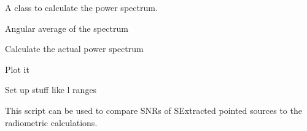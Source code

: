 \documentclass[a4paper,11pt,english]{sphinxmanual}
\begin{document}
\begin{fulllineitems}
\label{analysis:analysis.CTIpower.ps}
A class to calculate the power spectrum.

\begin{fulllineitems}
\label{analysis:analysis.CTIpower.ps.angavg}
Angular average of the spectrum

\end{fulllineitems}


\begin{fulllineitems}
\label{analysis:analysis.CTIpower.ps.create}
Calculate the actual power spectrum

\end{fulllineitems}


\begin{fulllineitems}
\label{analysis:analysis.CTIpower.ps.plot}
Plot it

\end{fulllineitems}


\begin{fulllineitems}
\label{analysis:analysis.CTIpower.ps.setup}
Set up stuff like l ranges

\end{fulllineitems}


\end{fulllineitems}

\label{analysis:module-analysis.compareSNRs}
This script can be used to compare SNRs of SExtracted pointed sources to the radiometric calculations.

\begin{fulllineitems}
\label{analysis:analysis.compareSNRs.compareCounts}
\end{fulllineitems}
\end{document}
